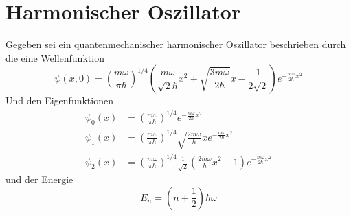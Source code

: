 \documentclass{scrartcl}
\begin{document}
\section{Harmonischer Oszillator}

Gegeben sei ein quantenmechanischer harmonischer Oszillator beschrieben durch die eine Wellenfunktion
\[\psi(x,0)=\left(\frac{m\omega}{\pi \hbar}\right)^{1/4}\left(\frac{m\omega}{\sqrt 2 \hbar}x^2+\sqrt{\frac{3m\omega}{2\hbar}}x-\frac{1}{2\sqrt 2}\right)e^{-\frac{m\omega}{2\hbar}x^2}\]
Und den Eigenfunktionen
\begin{align*}
\psi_0(x)	&=\left(\frac{m\omega}{\pi\hbar}\right)^{1/4}e^{-\frac{m\omega}{2\hbar}x^2}	\\
\psi_1(x)	&=\left(\frac{m\omega}{\pi\hbar}\right)^{1/4}\sqrt{\frac{2m\omega}{\hbar}}xe^{-\frac{m\omega}{2\hbar}x^2}	\\
\psi_2(x)	&=\left(\frac{m\omega}{\pi\hbar}\right)^{1/4}\frac{1}{\sqrt 2}\left(\frac{2m\omega}{\hbar}x^2-1\right)e^{-\frac{m\omega}{2\hbar}x^2}
\end{align*}
und der Energie 
\[E_n =\left(n+\frac{1}{2}\right)\hbar\omega\]
\end{document}
